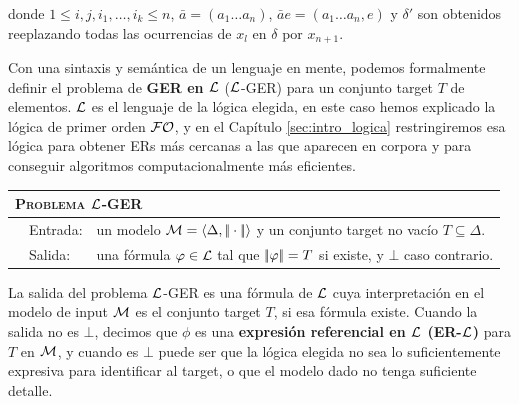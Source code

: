 donde $1 \le i,j, i_1, \ldots, i_k \le n$, $\bar{a} = (a_1\ldots
a_n)$, $\bar{a}e = (a_1\ldots a_n,e)$ y $\delta'$ son
obtenidos reeplazando todas las ocurrencias de $x_l$ en $\delta$ por
$x_{n+1}$. 

Con una sintaxis y sem\'antica de un lenguaje en mente, podemos formalmente definir el problema de \textbf{GER en $\mathcal{L}$} ($\mathcal{L}$-GER) para un conjunto target $T$ de elementos. $\mathcal{L}$ es el lenguaje de la l\'ogica elegida, en este caso hemos explicado la l\'ogica de primer orden $\mathcal{FO}$, y en el Cap\'itulo \ref{sec:intro_logica} restringiremos esa l\'ogica para obtener ERs m\'as cercanas a las que aparecen en corpora y para conseguir algoritmos computacionalmente m\'as eficientes.

\medskip
\noindent
{\small
\begin{center}
\begin{tabular}{ll} \hline
\multicolumn{2}{l}{
\textsc{Problema $\mathcal{L}$-GER }}\\ \hline
\ \ Entrada: & un modelo $\mathcal{M}=\langle \Delta,|\!|\cdot|\!| \rangle$ y un conjunto target no vac\'io $T \subseteq \Delta$.\\
\ \ Salida: & una f\'ormula $\varphi \in \mathcal{L}$ tal que
$|\!|\varphi|\!| = T$ si existe, y $\bot$ caso contrario.\\ \hline
\end{tabular}
\end{center}}
\medskip
La salida del problema $\mathcal{L}$-GER es una f\'ormula de
$\mathcal{L}$ cuya interpretaci\'on en el modelo de input $\mathcal{M}$ es el conjunto target $T$, si
esa f\'ormula existe. 
Cuando la salida no es $\bot$, decimos que $\phi$ es una
\textbf{expresi\'on referencial en $\mathcal{L}$ (ER-$\mathcal{L}$)} para $T$ en $\mathcal{M}$, y cuando es $\bot$ puede ser que la l\'ogica elegida no sea lo suficientemente expresiva para identificar al target, o que el modelo dado no tenga suficiente detalle.

